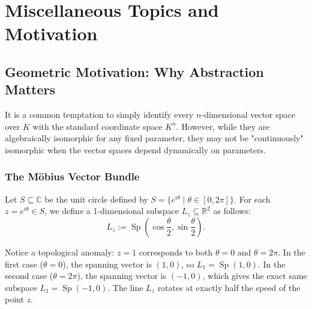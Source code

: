 \setcounter{chapter}{19} %
\chapter{Miscellaneous Topics and Motivation}

\section{Geometric Motivation: Why Abstraction Matters}

It is a common temptation to simply identify every $n$-dimensional vector space over $K$ with the standard coordinate space $K^n$. However, while they are algebraically isomorphic for any fixed parameter, they may not be "continuously" isomorphic when the vector spaces depend dynamically on parameters.

\subsection{The Möbius Vector Bundle}

\begin{definition}
  Let $S \subseteq \mathbb{C}$ be the unit circle defined by $S = \{e^{i\theta} \mid \theta \in [0, 2\pi]\}$. For each $z = e^{i\theta} \in S$, we define a 1-dimensional subspace $L_z \subseteq \mathbb{R}^2$ as follows:
  \[ L_z := \operatorname{Sp} \left( \cos\frac{\theta}{2}, \sin\frac{\theta}{2} \right). \]
\end{definition}

Notice a topological anomaly: $z=1$ corresponds to both $\theta=0$ and $\theta=2\pi$.
In the first case ($\theta=0$), the spanning vector is $(1,0)$, so $L_1 = \operatorname{Sp}(1,0)$.
In the second case ($\theta=2\pi$), the spanning vector is $(-1,0)$, which gives the exact same subspace $L_1 = \operatorname{Sp}(-1,0)$. The line $L_z$ rotates at exactly half the speed of the point $z$.

